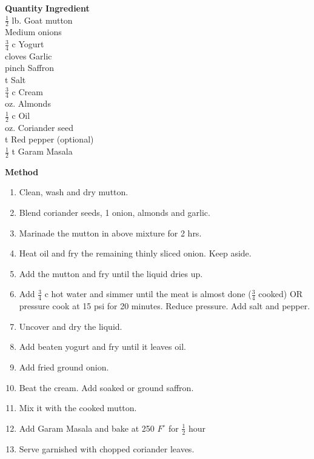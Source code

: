 \begin{tabbing}
\hspace{1.0cm}  \={\bf Quantity}   \hspace{3.0cm} \={\bf Ingredient}\\
 $\frac{1}{2}$ lb. \>Goat mutton\\
 \>Medium onions\\
\>$\frac{3}{4}$ c \>Yogurt\\
 cloves \>Garlic\\
\>pinch \>Saffron\\
 t \>Salt\\
\>$\frac{3}{4}$ c \>Cream\\
 oz. \>Almonds\\
\>$\frac{1}{2}$ c \>Oil\\
 oz. \>Coriander seed\\
 t \>Red pepper (optional)\\
\>$\frac{1}{2}$ t \>Garam Masala\\
\end{tabbing}

{\bf Method}
\begin{enumerate}
\item Clean, wash and dry mutton.
\item Blend coriander seeds, 1 onion, almonds and garlic.
\item Marinade the mutton in above mixture for 2 hrs.
\item Heat oil and fry the remaining thinly sliced onion.  Keep aside.
\item Add the mutton and fry until the liquid dries up.
\item Add $\frac{3}{4}$ c hot water and simmer until the meat is almost done ($\frac{3}{4}$ cooked) OR
pressure cook at 15 psi for 20 minutes.  Reduce pressure.  Add salt and pepper.
\item Uncover and dry the liquid.
\item Add beaten yogurt and fry until it leaves oil.
\item Add fried ground onion.
\item Beat the cream. Add soaked or ground saffron.
\item Mix it with the cooked mutton.
\item Add Garam Masala and bake at 250 $F^\circ$ for $\frac{1}{2}$ hour
\item Serve garnished with chopped coriander leaves.
\end{enumerate}


